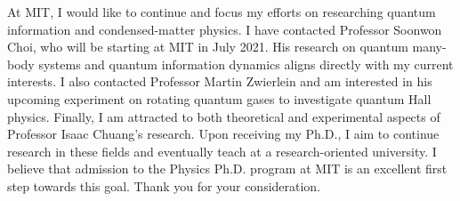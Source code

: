 \documentclass[12pt]{article}
\begin{document}
At MIT, I would like to continue and focus my efforts on researching quantum information and condensed-matter physics. I have contacted Professor Soonwon Choi, who will be starting at MIT in July 2021. His research on quantum many-body systems and quantum information dynamics aligns directly with my current interests. I also contacted Professor Martin Zwierlein and am interested in his upcoming experiment on rotating quantum gases to investigate quantum Hall physics. Finally, I am attracted to both theoretical and experimental aspects of Professor Isaac Chuang's research. Upon receiving my Ph.D., I aim to continue research in these fields and eventually teach at a research-oriented university. I believe that admission to the Physics Ph.D. program at MIT is an excellent first step towards this goal. Thank you for your consideration.
	

















	
	
	
	
	
\end{document}
